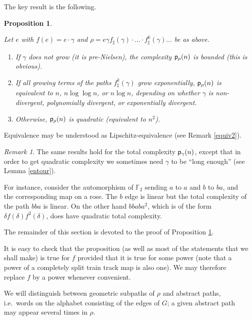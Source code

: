 \documentclass[11pt]{amsart}
\newtheorem{prop}[thm]{Proposition}
\theoremstyle{remark}
\newtheorem{rem}[thm]{Remark}
\newcommand{\cp}{{\sf  p}}
\newcommand {\F} {{\mathbb {F}}}
\begin{document}
 The key result is the following.

\begin{prop} \label{comptot}\label{compquadr}
  
  Let  $e$ with $f(e)=e\cdot\gamma$ and $\rho=e\gamma f_\sharp(\gamma)\cdot{\dots}\cdot f^k_\sharp(\gamma)\dots$ be as above.
 
   \begin{enumerate}
  \item If $\gamma$ does not grow (it is pre-Nielsen),  
the  complexity $\cp_\rho(n)$  is bounded   \emph{(this is obvious).} 
\item If all growing terms of the paths $f^k_\sharp(\gamma)$ grow exponentially, $\cp_\rho(n)$ is equivalent to $n$, $n\log \log n$, or $n\log n$, depending on whether $\gamma$ is non-divergent, polynomially divergent, or exponentially divergent.

  \item  
Otherwise,  
$\cp_\rho(n)$   
   is quadratic (equivalent to $n^2$).
     \end{enumerate} 
  \end{prop}
  
  Equivalence may be understood as Lipschitz-equivalence (see Remark \ref{equiv2}).
  

\begin{rem}\label{tcf}
The same results hold for  the  {total complexity} $\cp_\gamma(n)$,  
except that in order to get  quadratic complexity we sometimes need $\gamma$ to be ``long enough''  
(see Lemma \ref{entour}). 

For instance, consider the automorphism   of $\F_2$ sending $a$ to $a$ and $b$ to $ba$, and the corresponding map on a rose. The  $b $ edge is linear   but  the total complexity of the path  $bba$ is linear. On the other hand $bbaba^2$, which is of the form $\delta f(\delta) f^2 (\delta)$, does have quadratic total complexity.
\end{rem}




The remainder of this section is devoted to the proof of Proposition \ref{comptot}.  

It is easy to check that   the
proposition  
(as well as most of the statements that we shall make) is true for  
$f$ provided that it is true for some power  
(note that a  power of a completely split train track map is also one). 
We may therefore replace  
$f$ by  a power whenever convenient.   

  We will distinguish between geometric subpaths of $\rho$   
  and abstract paths, i.e.\ words on the alphabet consisting of the edges of $G$; a given abstract path may appear several times in 
  $\rho$. 
  
\end{document}
